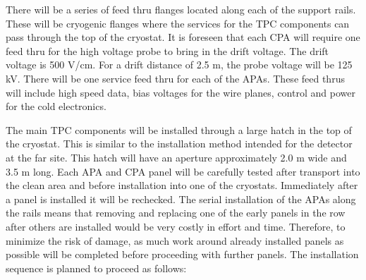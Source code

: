 There will be a series of feed thru flanges located along each of the support rails.  These will be cryogenic 
flanges where the services for the TPC components can pass through the top of the cryostat.  It is 
foreseen that each CPA will require one feed thru for the high voltage probe to bring in the drift voltage.  
The drift voltage is 500 V/cm.  For a drift distance of 2.5 m, the probe voltage will be 125 kV.  There will 
be one service feed thru for each of the APAs.  These feed thrus will include high speed data, bias 
voltages for the wire planes, control and power for the cold electronics.  

The main TPC components will be installed through a large hatch in the top of the cryostat.  This is 
similar to the installation method intended for the detector at the far site.  This hatch will have an 
aperture approximately 2.0 m wide and 3.5 m long.  Each APA and CPA panel will be carefully tested after 
transport into the clean area and before installation into one of the cryostats. Immediately after a panel is 
installed it will be rechecked. The serial installation of the APAs along the rails means that removing and 
replacing one of the early panels in the row after others are installed would be very costly in effort and 
time. Therefore, to minimize the risk of damage, as much work around already installed panels as 
possible will be completed before proceeding with further panels.
The installation sequence is planned to proceed as follows:

